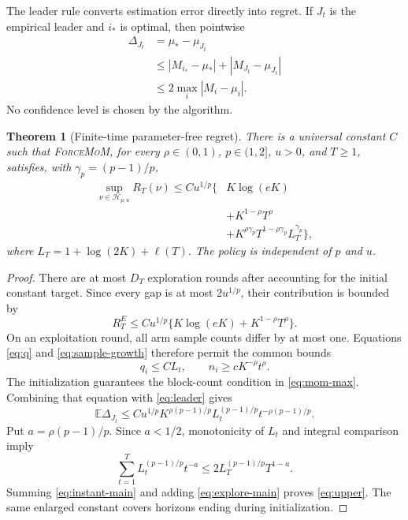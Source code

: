 \documentclass[twoside]{article}
\newtheorem{theorem}{Theorem}
\newcommand{\E}{\mathbb E}
\newcommand{\cH}{\mathcal H}
\newcommand{\FM}{\textnormal{\textsc{ForceMoM}}}
\begin{document}
The leader rule converts estimation error directly into regret. If $J_t$ is
the empirical leader and $i_*$ is optimal, then pointwise
\begin{align}
 \Delta_{J_t}
 &=\mu_*-\mu_{J_t}\nonumber\\
 &\leq |M_{i_*}-\mu_*|+|M_{J_t}-\mu_{J_t}|\nonumber\\
 &\leq2\max_i|M_i-\mu_i|.
 \label{eq:leader}
\end{align}
No confidence level is chosen by the algorithm.

\begin{theorem}[Finite-time parameter-free regret]
\label{thm:upper}
There is a universal constant $C$ such that \FM{}, for every
$\rho\in(0,1)$, $p\in(1,2]$, $u>0$, and $T\geq1$, satisfies, with
$\gamma_p=(p-1)/p$,
\begin{align}
 \sup_{\nu\in\cH_{p,u}}R_T(\nu)
 \leq C u^{1/p}\big\{&K\log(eK)
 \nonumber\\
 &+K^{1-\rho}T^\rho\nonumber\\
 &+K^{\rho\gamma_p}T^{1-\rho\gamma_p}
 L_T^{\gamma_p}\big\},
 \label{eq:upper}
\end{align}
where $L_T=1+\log(2K)+\ell(T)$. The policy is independent of $p$ and $u$.
\end{theorem}

\begin{proof}
There are at most $D_T$ exploration rounds after accounting for the initial
constant target. Since every gap is at most $2u^{1/p}$, their contribution
is bounded by
\begin{equation}
 R_T^E\leq C u^{1/p}\{K\log(eK)+K^{1-\rho}T^\rho\}.
 \label{eq:explore-main}
\end{equation}
On an exploitation round, all arm sample counts differ by at most one.
Equations \eqref{eq:q} and \eqref{eq:sample-growth} therefore permit the
common bounds
\[
 q_i\leq C L_t,
 \qquad n_i\geq cK^{-\rho}t^\rho.
\]
The initialization guarantees the block-count condition in
\eqref{eq:mom-max}. Combining that equation with \eqref{eq:leader} gives
\begin{equation}
 \E\Delta_{J_t}\leq
 C u^{1/p}K^{\rho(p-1)/p}
 L_t^{(p-1)/p}t^{-\rho(p-1)/p}.
 \label{eq:instant-main}
\end{equation}
Put $a=\rho(p-1)/p$. Since $a<1/2$, monotonicity of $L_t$ and integral
comparison imply
\[
 \sum_{t=1}^T L_t^{(p-1)/p}t^{-a}
 \leq2L_T^{(p-1)/p}T^{1-a}.
\]
Summing \eqref{eq:instant-main} and adding
\eqref{eq:explore-main} proves \eqref{eq:upper}. The same enlarged constant
covers horizons ending during initialization.
\end{proof}
\end{document}
